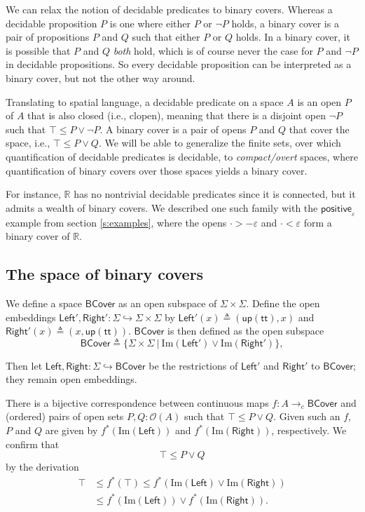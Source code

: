 \documentclass[conference]{IEEEtran}
\newcommand{\hookto}{\hookrightarrow}
\newcommand{\cto}{\to_c}
\newcommand{\R}{\mathbb{R}}
\newcommand{\suchthat}{\ |\ }
\newcommand{\Open}[1]{\mathcal{O}({#1})}
\newcommand{\Img}[1]{\text{Im}\left({#1}\right)}
\newcommand{\strue}{\mathsf{up}(\mathsf{tt})}
\newcommand{\BCover}{\mathsf{BCover}}
\newcommand{\iimg}[1]{#1^*}
\begin{document}
We can relax the notion of decidable predicates to binary covers. Whereas a decidable proposition $P$ is one where either $P$ or $\neg P$ holds, a binary cover is a pair of propositions $P$ and $Q$ such that either $P$ or $Q$ holds. In a binary cover, it is possible that $P$ and $Q$ \emph{both} hold, which is of course never the case for $P$ and $\neg P$ in decidable propositions. So every decidable proposition can be interpreted as a binary cover, but not the other way around.

Translating to spatial language, a decidable predicate on a space $A$ is an open $P$ of $A$ that is also closed (i.e., clopen), meaning that there is a disjoint open $\neg P$ such that $\top \le P \vee \neg P$. A binary cover is a pair of opens $P$ and $Q$ that cover the space, i.e., $\top \le P \vee Q$. We will be able to generalize the finite sets, over which quantification of decidable predicates is decidable, to \emph{compact/overt} spaces, where quantification of binary covers over those spaces yields a binary cover.

For instance, $\R$ has no nontrivial decidable predicates since it is connected, but it admits a wealth of binary covers. We described one such family with the $\mathsf{positive}_\varepsilon$ example from section \ref{s:examples}, where the opens $\cdot > - \varepsilon$ and $\cdot < \varepsilon$ form a binary cover of $\R$.

\subsection{The space of binary covers}

We define a space $\BCover$ as an open subspace of $\Sigma \times \Sigma$. Define the open embeddings $\mathsf{Left}', \mathsf{Right}' : \Sigma \hookto \Sigma \times \Sigma$ by 
$\mathsf{Left}'(x) \triangleq (\strue, x)$ and
$\mathsf{Right}'(x) \triangleq (x, \strue)$.
$\BCover$ is then defined as the open subspace
\[
\BCover \triangleq \{ \Sigma \times \Sigma \suchthat \Img{\mathsf{Left}'} \vee \Img{\mathsf{Right}'} \},
\]

Then let $\mathsf{Left}, \mathsf{Right} : \Sigma \hookto \BCover$ be the restrictions of $\mathsf{Left}'$ and $\mathsf{Right}'$ to $\BCover$; they remain open embeddings.

There is a bijective correspondence between continuous maps $f : A \cto \BCover$ and (ordered) pairs of open sets $P, Q : \Open{A}$ such that $\top \le P \vee Q$. Given such an $f$, $P$ and $Q$ are given by $\iimg{f}(\Img{\mathsf{Left}})$ and $\iimg{f}(\Img{\mathsf{Right}})$, respectively. We confirm that
\[
\top \le P \vee Q
\]
by the derivation
\begin{align*}
\top &\le \iimg{f}(\top) 
  \le \iimg{f}(\Img{\mathsf{Left}} \vee \Img{\mathsf{Right}})
 \\ &\le \iimg{f}(\Img{\mathsf{Left}}) \vee \iimg{f}(\Img{\mathsf{Right}}).
\end{align*}
\end{document}
